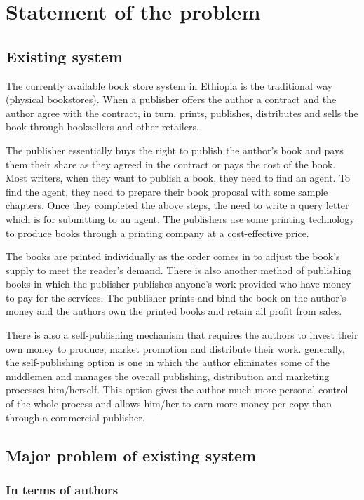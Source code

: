 \section{Statement of the problem}
	\subsection{Existing system}

The currently available book store system in Ethiopia is the traditional way (physical bookstores). When a publisher offers the author a contract and the author agree with the contract, in turn, prints, publishes, distributes and sells the book through booksellers and other retailers.

The publisher essentially buys the right to publish the author's book and pays them their share as they agreed in the contract or pays the cost of the book. Most writers, when they want to publish a book, they need to find an agent. To find the agent, they need to prepare their book proposal with some sample chapters. Once they completed the above steps, the need to write a query letter which is for submitting to an agent. The publishers use some printing technology to produce books through a printing company at a cost-effective price.

The books are printed individually as the order comes in to adjust the book's supply to meet the reader's demand.  There is also another method of publishing books in which the publisher publishes anyone’s work provided who have money to pay for the services. The publisher prints and bind the book on the author's money and the authors own the printed books and retain all profit from sales.

There is also a self-publishing mechanism that requires the authors to invest their own money to produce, market promotion and distribute their work. generally, the self-publishing option is one in which the author eliminates some of the middlemen and manages the overall publishing, distribution and marketing processes him/herself. This option gives the author much more personal control of the whole process and allows him/her to earn more money per copy than through a commercial publisher.

	\subsection{Major problem of existing system}
		\subsubsection{In terms of authors}

